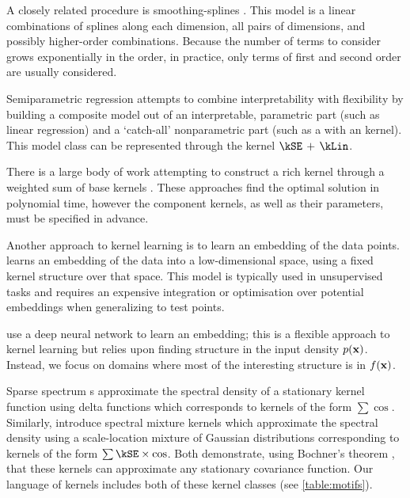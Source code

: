 A closely related procedure is smoothing-splines \ANOVA{} \citep{wahba1990spline, gu2002smoothing}.
This model is a linear combinations of splines along each dimension, all pairs of dimensions, and possibly higher-order combinations.
Because the number of terms to consider grows exponentially in the order, in practice, only terms of first and second order are usually considered.

Semiparametric regression \citep[e.g.][]{ruppert2003semiparametric} attempts to combine interpretability with flexibility by building a composite model out of an interpretable, parametric part (such as linear regression) and a `catch-all' nonparametric part (such as a \gp{} with an \kSE{} kernel).
This model class can be represented through the kernel ${\kSE \kernplus \kLin}$.


There is a large body of work attempting to construct a rich kernel through a weighted sum of base kernels \citep[e.g.][]{christoudias2009bayesian, Bach_HKL}.
These approaches find the optimal solution in polynomial time, however the component kernels, as well as their parameters, must be specified in advance.

Another approach to kernel learning is to learn an embedding of the data points. 
\citet{lawrence2005probabilistic} learns an embedding of the data into a low-dimensional space, using a fixed kernel structure over that space.
This model is typically used in unsupervised tasks and requires an expensive integration or optimisation over potential embeddings when generalizing to test points.

\citet{salakhutdinov2008using} use a deep neural network to learn an embedding;
this is a flexible approach to kernel learning but relies upon finding structure in the input density $p({\bf{x}})$.
Instead, we focus on domains where most of the interesting structure is in $f({\bf{x}})$.

Sparse spectrum \gp{}s \citep{lazaro2010sparse} approximate the spectral density of a stationary kernel function using delta functions which corresponds to kernels of the form $\sum \cos$.
Similarly, \citet{WilAda13} introduce spectral mixture kernels which approximate the spectral density using a scale-location mixture of Gaussian distributions corresponding to kernels of the form $\sum \kSE \times \cos$.
Both demonstrate, using Bochner's theorem \citep{bochner1959lectures}, that these kernels can approximate any stationary covariance function.
Our language of kernels includes both of these kernel classes (see \cref{table:motifs}).

